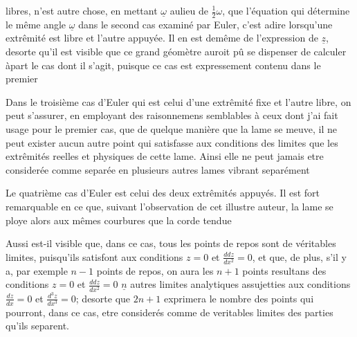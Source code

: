 \documentclass[11pt,a4paper]{article}
\begin{document}

libres, n'est autre chose, en mettant $\underline{\omega}$ aulieu de $\frac{1}{2}\omega$, que
l'équation qui détermine le même angle $\underline{\omega}$ dans le second
cas examiné par Euler, c'est adire lorsqu'une extrêmité
est libre et l'autre appuyée. Il en est demême de
l'expression de $\underline{z}$, desorte qu'il est visible que ce grand
géomètre auroit pû se dispenser de calculer àpart
le cas dont il s'agit, puisque ce cas est expressement
contenu dans le premier

Dans le troisième cas d'Euler qui est celui d'une
extrêmité fixe et l'autre libre, on peut s'assurer,
en employant des raisonnemens semblables à ceux
dont j'ai fait usage pour le premier cas, que de
quelque manière que la lame se meuve, il ne
peut exister aucun autre point qui satisfasse aux
conditions des limites que les extrêmités reelles et
physiques de cette lame. Ainsi elle ne peut jamais
etre considerée  comme separée en plusieurs
autres lames vibrant separément

Le quatrième cas d'Euler est celui des deux
extrêmités appuyés. Il est fort remarquable
en ce que, suivant  l'observation de
cet illustre auteur, la lame se ploye alors
aux mêmes courbures que la corde tendue


Aussi est-il visible que, dans ce cas, tous les points de repos
sont de véritables limites, puisqu'ils satisfont  aux conditions
$z=0$ et $\frac{ddz}{dx^2}=0$, et que, de plus,  s'il y a, par exemple
$n-1$ points de repos, on aura  les $n+1$ points 
resultans des conditions $z=0$ et $\frac{ddz}{dx^2}=0$ $\underline{n}$ autres limites
analytiques assujetties aux conditions $\frac{dz}{dx}=0$ et $\frac{d^3z}{dx^3}=0$; desorte
que $2n+1$ exprimera le nombre des points qui pourront,
dans ce cas, etre considerés comme de veritables limites
des parties qu'ils separent.
\end{document}
